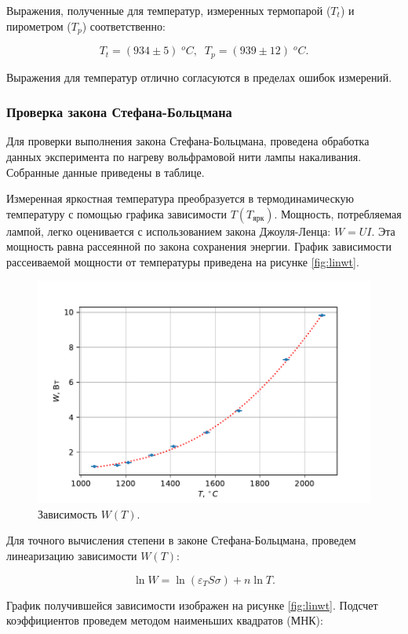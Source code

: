 \documentclass[12pt,a4paper]{article}
\begin{document}
Выражения, полученные для температур, измеренных термопарой ($T_t$) и пирометром  ($T_p$) соответственно:

$$T_t = (934 \pm 5)\;^oC,\;\; T_p = (939 \pm 12)\;^oC.$$

Выражения для температур отлично согласуются в пределах ошибок измерений.

\subsubsection*{Проверка закона Стефана-Больцмана}

Для проверки выполнения закона Стефана-Больцмана, проведена обработка данных эксперимента по нагреву вольфрамовой нити лампы накаливания. Собранные данные приведены в таблице.


Измеренная яркостная температура преобразуется в термодинамическую температуру с помощью графика зависимости $T(T_{\text{ярк}})$. Мощность, потребляемая лампой, легко оценивается с использованием закона Джоуля-Ленца: $W = UI$. Эта мощность равна рассеянной по закона сохранения энергии. График зависимости рассеиваемой мощности от температуры приведена на рисунке \ref{fig:linwt}.

\begin{figure}[h]
	\includegraphics[scale=0.8]{gen/fig-wt.pdf}
	\caption{Зависимость $W(T)$.}
	\label{fig:wt}
\end{figure}

Для точного вычисления степени в законе Стефана-Больцмана, проведем линеаризацию зависимости $W(T)$: 

$$\ln W = \ln (\varepsilon_T S \sigma) + n \ln T. $$

График получившейся зависимости изображен на рисунке \ref{fig:linwt}. Подсчет коэффициентов проведем методом наименьших квадратов (МНК):
\end{document}
